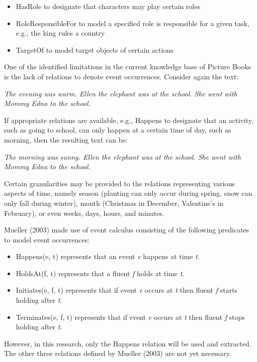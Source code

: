 \begin{itemize}
	\item HasRole to designate that characters may play certain roles
	\item RoleResponsibleFor to model a specified role is responsible for a given task, e.g., the king rules a country
	\item TargetOf to model target objects of certain actions
\end{itemize}

One of the identified limitations in the current knowledge base of Picture Books is the lack of relations to denote event occurrences. Consider again the text:
	
	\noindent
	\hspace{1 in}\emph{The evening was warm. Ellen the elephant was at the school. She went with Mommy Edna to the school.}
	
	If appropriate relations are available, e.g., Happens to designate that an activity, such as going to school, can only happen at a certain time of day, such as morning, then the resulting text can be:
	
	\noindent
	\hspace{1 in}\emph{The morning was sunny. Ellen the elephant was at the school. She went with Mommy Edna to the school.}
	
Certain granularities may be provided to the relations representing various aspects of time, namely season (planting can only occur during spring, snow can only fall during winter), month (Christmas in December, Valentine's in February), or even weeks, days, hours, and minutes.

Mueller (2003) made use of event calculus consisting of the following predicates to model event occurrences:

\begin{itemize}
	\item Happens(e, t) represents that an event \emph{e} happens at time \emph{t}.
	\item HoldsAt(f, t) represents that a fluent \emph{f} holds at time \emph{t}.
	\item Initiates(e, f, t) represents that if event \emph{e} occurs at \emph{t} then fluent \emph{f} starts holding after \emph{t}.
	\item Terminates(e, f, t) represents that if event \emph{e} occurs at \emph{t} then fluent \emph{f} stops holding after \emph{t}.
\end{itemize}

However, in this research, only the Happens relation will be used and extracted. The other three relations defined by Mueller (2003) are not yet necessary.

